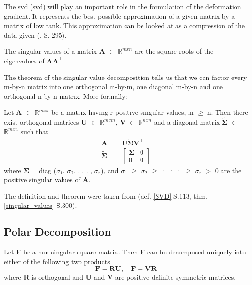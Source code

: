 The \acrlong{svd} (\acrshort{svd}) will play an important role in the formulation of the deformation gradient. It represents the best possible approximation of a given matrix by a matrix of low rank. This approximation can be looked at as a compression of the data given (\cite{LiesenMehrmann2015}, S. 295).

\begin{definition}
\label{singular_values}
The singular values of a matrix $\mathbf{A}$ $\in$ $\mathbb{R}^{m x n}$ are the square roots of the eigenvalues of $\mathbf{AA}^{\intercal}$.
\end{definition}

The theorem of the singular value decomposition tells us that we can factor every m-by-n matrix into one orthogonal m-by-m, one diagonal m-by-n and one orthogonal n-by-n matrix. More formally:

\begin{theorem}
\label{SVD}
Let $\mathbf{A}$ $\in$ $\mathbb{R}^{m x n}$ be a matrix having r positive singular values, m $\geq$ n. Then there exist orthogonal matrices $\mathbf{U}$ $\in$ $\mathbb{R}^{m x m}$, $\mathbf{V}$ $\in$ $\mathbb{R}^{n x n}$ and a diagonal matrix $\mathbf{\tilde{\Sigma}}$ $\in$ $\mathbb{R}^{m x n}$ such that
\begin{align*}
\mathbf{A} &= \mathbf{U \tilde{\Sigma} V^\intercal} \\
\mathbf{\tilde{\Sigma}} &= \left[ \begin{array}{cc} \mathbf{\Sigma} & 0 \\ 0 & 0 \end{array} \right]
\end{align*}
where $\mathbf{\Sigma}$ = diag ($\sigma_1$, $\sigma_2$, . . . , $\sigma_r$), and $\sigma_1$ $\geq$ $\sigma_2$ $\geq$ · · · $\geq$ $\sigma_r$ $>$ 0 are the positive singular values of $\mathbf{A}$.

\end{theorem}
The definition and theorem were taken from \cite{ford2014numerical} (def. \ref{SVD} S.113, thm. \ref{singular_values} S.300).




\subsection{Polar Decomposition}

\begin{theorem}
\label{PD}

Let $\mathbf{F}$ be a non-singular square matrix. Then $\mathbf{F}$ can be decomposed uniquely into either of the following two products
\[
\mathbf{F} = \mathbf{RU}, \quad \mathbf{F} = \mathbf{VR}
\]
where $\mathbf{R}$ is orthogonal and $\mathbf{U}$ and $\mathbf{V}$ are positive definite symmetric matrices.
\end{theorem}

